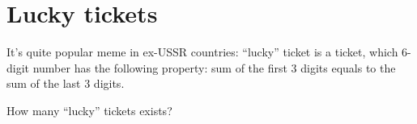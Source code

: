 \section{Lucky tickets}

It's quite popular meme in ex-USSR countries: ``lucky'' ticket is a ticket, which 6-digit number has the following property:
sum of the first 3 digits equals to the sum of the last 3 digits.

How many ``lucky'' tickets exists?




